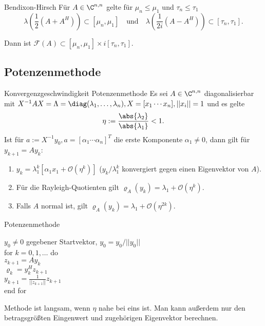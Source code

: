 \begin{karte}{Bendixon-Hirsch}
    Für \( A\in \C^{n,n} \) gelte für \( \mu_n \leq \mu_1 \) und 
    \( \tau_n \leq \tau_1 \) 
    \[ \lambda \left( \frac{1}{2} (A + A^H) \right) \subset [\mu_n, \mu_1] \quad \text{und} 
    \quad \lambda \left( \frac{1}{2i} (A - A^H) \right) \subset [\tau_n, \tau_1]. \]

    Dann ist \( \mathcal{F}(A) \subset [\mu_n, \mu_1] \times i[\tau_n, \tau_1] \).
\end{karte}

\subsection{Potenzenmethode}

\begin{karte}{Konvergenzgeschwindigkeit Potenzenmethode}
    Es sei \( A\in \C^{n,n} \) diagonalisierbar mit \( X^{-1} A X = \Lambda = \diag(\lambda_1, \ldots, \lambda_n), 
    X = [x_1 \cdots x_n], ||x_i|| = 1 \) und es gelte 
    \[ \eta := \frac{\abs{\lambda_2}}{\abs{\lambda_1}} < 1. \]
    Ist für \( a := X^{-1}y_0, a = [\alpha_1 \cdots \alpha_n]^T \) die erste Komponente \( \alpha_1 \neq 0 \), 
    dann gilt für \( y_{k+1} = A y_k \):
    \begin{enumerate}
        \item \( y_k = \lambda_1^k [\alpha_1 x_1 + \mathcal{O}(\eta^k)] \) (\(y_k/\lambda_1^k\) konvergiert 
        gegen einen Eigenvektor von \(A\)).
        \item Für die Rayleigh-Quotienten gilt \( \varrho_A(y_k) = \lambda_1 + \mathcal{O}(\eta^k) \).
        \item Falls \(A\) normal ist, gilt \( \varrho_A(y_k) = \lambda_1 + \mathcal{O}(\eta^{2k}) \).
    \end{enumerate}
\end{karte}

\begin{karte}{Potenzenmethode}
    \begin{tabbing}
        \(y_0 \neq 0\) gegebener Startvektor, \(y_0 = y_0 / ||y_0||\) \\
        for \= \( k = 0,1,\ldots \) do \\
        \> \( z_{k+1} = A y_k \) \\
        \> \( \varrho_k = y_k^H z_{k+1} \) \\
        \> \( y_{k+1} = \frac{1}{||z_{k+1}||} z_{k+1}\) \\
        end for
    \end{tabbing}
    Methode ist langsam, wenn \( \eta \) nahe bei eins ist. 
    Man kann außerdem nur den betragsgrößten Eingenwert und zugehörigen 
    Eigenvektor berechnen. 
\end{karte}

